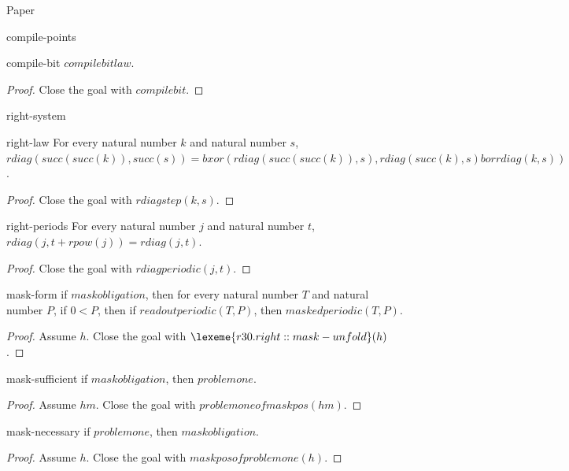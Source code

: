 \begin{lexlean}{Paper}
\begin{section}{compile-points}
  \begin{theorem}{compile-bit}
  \(compilebitlaw\).
  \begin{proof}
  Close the goal with \(compilebit\).
  \end{proof}
  \end{theorem}
\end{section}

\begin{section}{right-system}
  \begin{lemma}{right-law}
  For every natural number \(k\) and natural number \(s\), \(rdiag(succ(succ(k)), succ(s)) = bxor(rdiag(succ(succ(k)), s), rdiag(succ(k), s) bor rdiag(k, s))\).
  \begin{proof}
  Close the goal with \(rdiagstep(k, s)\).
  \end{proof}
  \end{lemma}

  \begin{theorem}{right-periods}
  For every natural number \(j\) and natural number \(t\), \(rdiag(j, t + rpow(j)) = rdiag(j, t)\).
  \begin{proof}
  Close the goal with \(rdiagperiodic(j, t)\).
  \end{proof}
  \end{theorem}

  \begin{theorem}{mask-form}
  if \(maskobligation\), then for every natural number \(T\) and natural number \(P\), if \(0 < P\), then if \(readoutperiodic(T, P)\), then \(maskedperiodic(T, P)\).
  \begin{proof}
  Assume \(h\).
  Close the goal with \(\lexeme{r30.right::mask-unfold}(h)\).
  \end{proof}
  \end{theorem}

  \begin{theorem}{mask-sufficient}
  if \(maskobligation\), then \(problemone\).
  \begin{proof}
  Assume \(hm\).
  Close the goal with \(problemoneofmaskpos(hm)\).
  \end{proof}
  \end{theorem}

  \begin{theorem}{mask-necessary}
  if \(problemone\), then \(maskobligation\).
  \begin{proof}
  Assume \(h\).
  Close the goal with \(maskposofproblemone(h)\).
  \end{proof}
  \end{theorem}


\end{section}
\end{lexlean}
